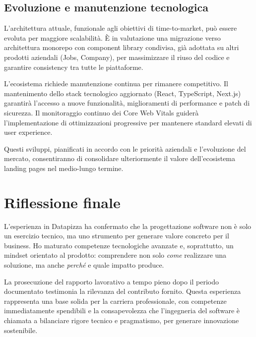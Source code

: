 \subsection{Evoluzione e manutenzione tecnologica}

L'architettura attuale, funzionale agli obiettivi di time-to-market, può essere 
evoluta per maggiore scalabilità. È in valutazione una migrazione verso 
architettura monorepo con component library condivisa, già adottata su altri 
prodotti aziendali (Jobs, Company), per massimizzare il riuso del codice e 
garantire consistency tra tutte le piattaforme.

L'ecosistema richiede manutenzione continua per rimanere competitivo. Il 
mantenimento dello stack tecnologico aggiornato (React, TypeScript, Next.js) 
garantirà l'accesso a nuove funzionalità, miglioramenti di performance e patch 
di sicurezza. Il monitoraggio continuo dei Core Web Vitals guiderà 
l'implementazione di ottimizzazioni progressive per mantenere standard elevati 
di user experience.

\medskip
Questi sviluppi, pianificati in accordo con le priorità aziendali e l'evoluzione 
del mercato, consentiranno di consolidare ulteriormente il valore dell'ecosistema 
landing pages nel medio-lungo termine.

\section{Riflessione finale}
L'esperienza in Datapizza ha confermato che la progettazione software non è solo
un esercizio tecnico, ma uno strumento per generare valore concreto per il business.
Ho maturato competenze tecnologiche avanzate e, soprattutto, un mindset orientato al prodotto:
comprendere non solo \textit{come} realizzare una soluzione, ma anche \textit{perché}
e quale impatto produce.

La prosecuzione del rapporto lavorativo a tempo pieno dopo il periodo documentato
testimonia la rilevanza del contributo fornito. Questa esperienza rappresenta una base solida
per la carriera professionale, con competenze immediatamente spendibili e la consapevolezza
che l'ingegneria del software è chiamata a bilanciare rigore tecnico e pragmatismo,
per generare innovazione sostenibile.